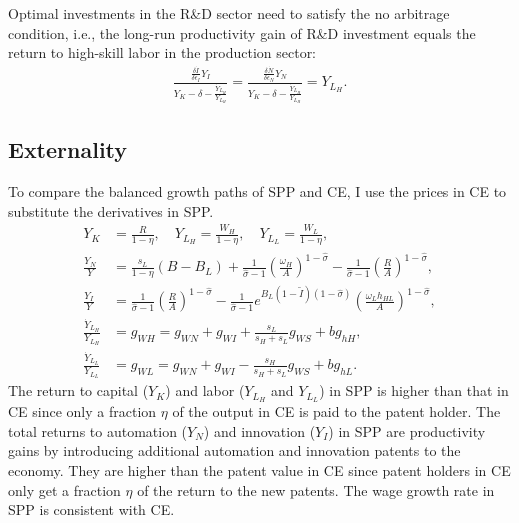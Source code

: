 \documentclass[12pt]{article}
\begin{document}
Optimal investments in the R\&D sector need to satisfy the no arbitrage condition, i.e., the long-run productivity gain of R\&D investment equals the return to high-skill labor in the production sector: 
\begin{align*}
\frac{\frac{\delta \dot{I}}{\delta \epsilon_I}Y_I}{Y_K-\delta-\frac{\dot{Y}_{L_H}}{Y_{L_H}}} = \frac{\frac{\delta \dot{N}}{\delta \epsilon_N}Y_N}{Y_K-\delta-\frac{\dot{Y}_{L_H}}{Y_{L_H}}} = Y_{L_H}.
\end{align*}

\subsection{Externality}
To compare the balanced growth paths of SPP and CE, I use the prices in CE to substitute the derivatives in SPP.  
\begin{align*}
Y_K &= \frac{R}{1-\eta}, \quad Y_{L_H}= \frac{W_H}{1-\eta}, \quad Y_{L_L}= \frac{W_L}{1-\eta}, \\
\frac{Y_{N}}{Y} &=\frac{s_L}{1-\eta}(B-B_L)+\frac{1}{\hat{\sigma}-1}(\frac{\omega_H}{A})^{1-\hat{\sigma}}-\frac{1}{\hat{\sigma}-1}(\frac{R}{A})^{1-\hat{\sigma}}, \\
\frac{Y_{I}}{Y} &=\frac{1}{\hat{\sigma}-1}(\frac{R}{A})^{1-\hat{\sigma}}-\frac{1}{\hat{\sigma}-1}e^{B_L(1-\tilde{I})(1-\hat{\sigma})}(\frac{\omega_Lh_{HL}}{A})^{1-\hat{\sigma}}, \\
\frac{\dot{Y}_{L_H}}{Y_{L_H}} &= g_{WH} = g_{WN}+g_{WI}+\frac{s_L}{s_H+s_L}g_{WS} +bg_{hH},\\
\frac{\dot{Y}_{L_L}}{Y_{L_L}} &= g_{WL} = g_{WN}+g_{WI}-\frac{s_H}{s_H+s_L}g_{WS} +bg_{hL}.
\end{align*}
The return to capital ($Y_K$) and labor ($Y_{L_H}$ and $Y_{L_L}$) in SPP is higher than that in CE since only a fraction $\eta$ of the output in CE is paid to the patent holder. The total returns to automation ($Y_N$) and innovation ($Y_I$) in SPP are productivity gains by introducing additional automation and innovation patents to the economy. They are higher than the patent value in CE since patent holders in CE only get a fraction $\eta$ of the return to the new patents. The wage growth rate in SPP is consistent with CE. 
\end{document}
